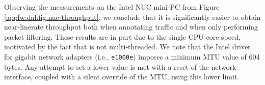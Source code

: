 

Observing the measurements on the Intel NUC mini-PC from Figure \ref{appfw:daf:fig:nuc-throughput}, we conclude that it is significantly easier to obtain near-linerate throughput both when annotating traffic and when only performing packet filtering. These results are in part due to the single CPU core speed, motivated by the fact that \daf{} is not multi-threaded. We note that the Intel driver for gigabit network adapters (i.e., \texttt{e1000e}) imposes a minimum MTU value of 604 bytes. Any attempt to set a lower value is met with a reset of the network interface, coupled with a silent override of the MTU, using this lower limit.

